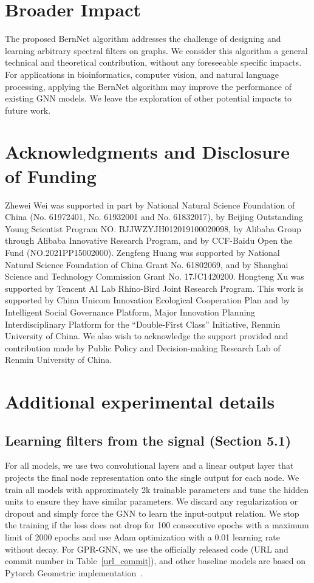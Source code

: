 \documentclass{article}
\begin{document}
\section*{Broader Impact}
\label{sec:impact}
The proposed BernNet algorithm addresses the challenge of designing and learning arbitrary spectral filters on graphs. We consider this algorithm a general technical and theoretical contribution, without any foreseeable specific impacts. For applications in bioinformatics, computer vision, and natural language processing, applying the BernNet algorithm may improve the performance of existing GNN models. We leave the exploration of other potential impacts to future work.


\section*{Acknowledgments and Disclosure of Funding}
Zhewei Wei was supported in part by National Natural Science Foundation of China (No. 61972401, No. 61932001 and No. 61832017), by Beijing Outstanding Young Scientist Program NO. BJJWZYJH012019100020098, by Alibaba Group through Alibaba Innovative Research Program, and by CCF-Baidu Open the Fund (NO.2021PP15002000). 
Zengfeng Huang was supported by National Natural Science Foundation of China Grant No. 61802069, and by Shanghai Science and Technology Commission Grant No. 17JC1420200.
Hongteng Xu was supported by Tencent AI Lab Rhino-Bird Joint Research Program.
This work is supported by China Unicom Innovation Ecological Cooperation Plan and by Intelligent Social Governance Platform, Major Innovation  Planning Interdisciplinary Platform for the “Double-First Class” Initiative, Renmin University of China. We also wish to acknowledge the support provided and contribution made by Public Policy and Decision-making Research Lab of Renmin University of China.

\newpage




\newpage

\appendix


\section{Additional experimental details}
\subsection{Learning filters from the signal (Section 5.1)}
For all models, we use two convolutional layers and a linear output layer that projects the final node representation onto the single output for each node. We train all models with approximately 2k trainable parameters and tune the hidden units to ensure they have similar parameters. We discard any regularization or dropout and simply force the GNN to learn the input-output relation. We stop the training if the loss does not drop for 100 consecutive epochs with a maximum limit of 2000 epochs and use Adam optimization with a 0.01 learning rate without decay. For GPR-GNN, we use the officially released code (URL and commit number in Table~\ref{url_commit}), and other baseline models are based on Pytorch Geometric implementation~\cite{fey2019fast}.
\end{document}
